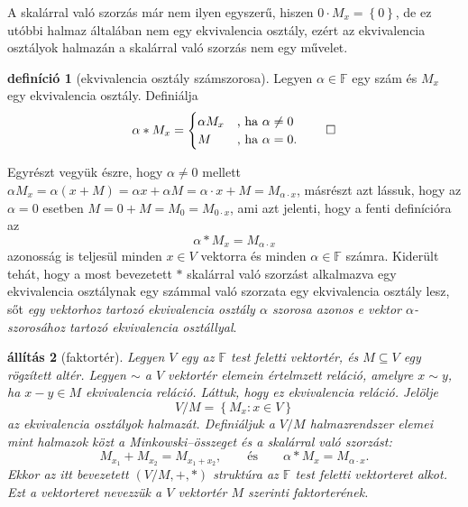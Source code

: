 \documentclass[9pt, showtrims]{memoir}
\theoremstyle{plain}
\newtheorem{proposition}{állítás}[section]
\theoremstyle{remark}
\theoremstyle{definition}
\newtheorem{definition}[proposition]{definíció}
\begin{document}
    A skalárral való szorzás már nem ilyen egyszerű,
    hiszen $0\cdot M_x=\left\{ 0 \right\}$, de ez utóbbi halmaz általában nem egy ekvivalencia osztály,
    ezért az ekvivalencia osztályok halmazán a skalárral való szorzás nem egy művelet.
    \begin{definition}[ekvivalencia osztály számszorosa]
        Legyen $\alpha\in\mathbb{F}$ egy szám és $M_{x}$ egy ekvivalencia osztály.
        Definiálja
        \[
            \alpha\ast M_x=
            \begin{cases}
                \alpha M_x&\text{, ha }\alpha\neq 0\\
                M&\text{, ha }\alpha=0.
            \end{cases}\qedhere
        \]
    \end{definition}
    Egyrészt vegyük észre,
    hogy $\alpha\neq 0$ mellett
    $\alpha M_x=\alpha\left( x+M \right)=\alpha x+\alpha M=\alpha\cdot x+M=M_{\alpha\cdot x}$,
    másrészt azt lássuk, 
    hogy az $\alpha=0$ esetben
    $M=0+M=M_0=M_{0\cdot x}$, ami azt jelenti, hogy a fenti definícióra az
    \[
        \alpha\ast M_x=M_{\alpha\cdot x}\tag{\ddag}
    \]
    azonosság is teljesül minden $x\in V$ vektorra és minden $\alpha\in\mathbb{F}$ számra.
    Kiderült tehát, hogy a most bevezetett $\ast$ skalárral való szorzást alkalmazva
    egy ekvivalencia osztálynak egy számmal való szorzata egy ekvivalencia osztály lesz,
    sőt
    \emph{egy vektorhoz tartozó ekvivalencia osztály $\alpha$ szorosa azonos e vektor $\alpha$-szorosához tartozó
    ekvivalencia osztállyal}.
    \begin{proposition}[faktortér]
    Legyen $V$ egy az $\mathbb{F}$ test feletti vektortér,
    és $M\subseteq V$ egy rögzített altér.
    Legyen $\sim$ a $V$ vektortér elemein értelmzett reláció,
    amelyre $x\sim y$, ha $x-y\in M$ ekvivalencia reláció.
    Láttuk, hogy ez ekvivalencia reláció.
    Jelölje
    \[
        V/M=\left\{ M_x:x\in V \right\}
    \]
    az ekvivalencia osztályok halmazát.
    Definiáljuk a $V/M$ halmazrendszer elemei mint halmazok közt
    a Minkowski--összeget és a skalárral való szorzást:
    \[
        M_{x_1}+M_{x_2}=M_{x_1+x_2},
        \qquad
        \text{és}
        \qquad
        \alpha\ast M_x=M_{\alpha\cdot x}.
    \]
    Ekkor az itt bevezetett $(V/M,+,\ast)$ struktúra az $\mathbb{F}$ test feletti vektorteret alkot.
    Ezt a vektorteret nevezzük a $V$ vektortér $M$ szerinti \emph{faktorterének}.
\end{proposition}
\end{document}
